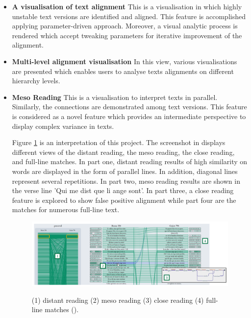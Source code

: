 \begin{itemize}
	\item \textbf{A visualisation of text alignment} This is a visualisation in which highly unstable text versions are identified and aligned. This feature is accomplished applying parameter-driven approach. Moreover, a visual analytic process is rendered which accept tweaking parameters for iterative improvement of the alignment.
	\item \textbf{Multi-level alignment visualisation} In this view, various visualisations are presented which enables users to analyse texts alignments on different hierarchy levels.
	\item \textbf{Meso Reading} This is a visualisation to interpret texts in parallel. Similarly, the connections are demonstrated among text versions. This feature is considered as a novel feature which provides an intermediate perspective to display complex variance in texts.
	
	Figure \ref{fig:mesoReading} is an interpretation of this project. The screenshot in \cite{Stefan2017} displays different views of the distant reading, the meso reading, the close reading, and full-line matches. In part one, distant reading results of high similarity on words are displayed in the form of parallel lines. In addition, diagonal lines represent several repetitions. In part two, meso reading results are shown in the verse line 'Qui me dist que li ange sont'. In part three, a close reading feature is explored to show false positive alignment while part four are the matches for numerous full-line text.
	
	\begin{figure}[H]
		\centering    
		\includegraphics[scale=0.5]{Figs/Meso-Reading}\\[1ex]
		\caption{ (1) distant reading (2) meso reading (3) close reading (4) full-line matches (\cite{Stefan2017}).}
		\label{fig:mesoReading}
	\end{figure} 
	
	
\end{itemize}

